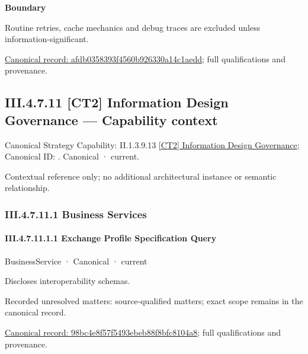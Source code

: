 \textbf{Boundary}



Routine retries, cache mechanics and debug traces are excluded unless information-significant.


{\footnotesize \href{../../../../continuum/business/business-function/afdb0358393f4560b926330a14c1aedd.md}{Canonical record: afdb0358393f4560b926330a14c1aedd}; full qualifications and provenance.}\par
\subsection*{III.4.7.11 [CT2] Information Design Governance — Capability context}
\label{navigation:III.4.7.11}

{\small Canonical Strategy Capability: II.1.3.9.13 \hyperref[element:f39ed9ebcc724857a4bf7a2b8e045c7a]{[CT2] Information Design Governance}; Canonical ID: \texttt{}. Canonical · current.}\par
Contextual reference only; no additional architectural instance or semantic relationship.\par
\subsubsection*{III.4.7.11.1 Business Services}
\label{navigation:III.4.7.11.1}

\paragraph*{III.4.7.11.1.1 Exchange Profile Specification Query}
\label{navigation:III.4.7.11.1.1}

\label{element:98bc4e8f57f5493ebeb88f8bfc8104a8}
{\small BusinessService · Canonical · current}\par

Discloses interoperability schemas.


{\small Recorded unresolved matters: source-qualified matters; exact scope remains in the canonical record.}\par
{\footnotesize \href{../../../../continuum/business/business-service/98bc4e8f57f5493ebeb88f8bfc8104a8.md}{Canonical record: 98bc4e8f57f5493ebeb88f8bfc8104a8}; full qualifications and provenance.}\par
